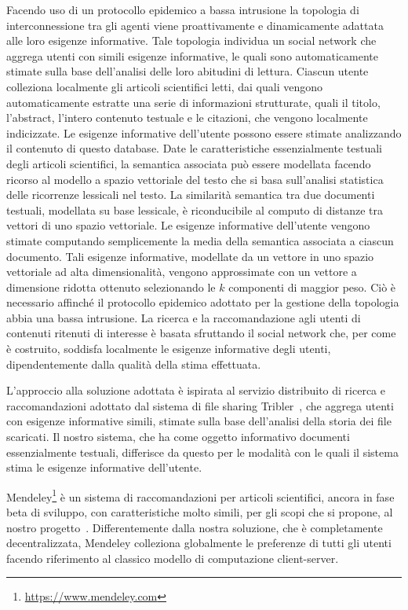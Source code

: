 Facendo uso di un protocollo epidemico a bassa intrusione la topologia di interconnessione tra gli agenti viene proattivamente e dinamicamente adattata alle loro esigenze informative. Tale topologia individua un social network che  aggrega utenti con simili esigenze informative, le quali sono automaticamente stimate sulla base dell'analisi delle loro abitudini di lettura. Ciascun utente colleziona localmente gli articoli scientifici letti, dai quali vengono automaticamente estratte una serie di informazioni strutturate, quali il titolo, l'abstract, l'intero contenuto testuale e le citazioni, che vengono localmente indicizzate. Le esigenze informative dell'utente possono essere stimate analizzando il contenuto di questo database. Date le caratteristiche essenzialmente testuali degli articoli scientifici, la semantica associata può essere modellata facendo ricorso al modello a spazio vettoriale del testo che si basa sull'analisi statistica delle ricorrenze lessicali nel testo. La similarità semantica tra due documenti testuali, modellata su base lessicale, è riconducibile al computo di distanze tra vettori di uno spazio vettoriale. Le esigenze informative dell'utente vengono stimate computando semplicemente la media della semantica associata a ciascun documento. Tali esigenze informative, modellate da un vettore in uno spazio vettoriale ad alta dimensionalità, vengono approssimate con un vettore a dimensione ridotta ottenuto selezionando le $k$ componenti di maggior peso. Ciò è necessario affinché il protocollo epidemico adottato per la gestione della topologia abbia una bassa intrusione. La ricerca e la raccomandazione agli utenti di contenuti ritenuti di interesse è basata sfruttando il social network che, per come è costruito, soddisfa localmente le esigenze informative degli utenti, dipendentemente dalla qualità della stima effettuata.

L'approccio alla soluzione adottata è ispirata al servizio distribuito di ricerca e raccomandazioni adottato dal sistema di file sharing Tribler~\cite{PGW+08}, che aggrega utenti con esigenze informative simili, stimate sulla base dell'analisi della storia dei file scaricati. Il nostro sistema, che ha come oggetto informativo documenti essenzialmente testuali, differisce da questo per le modalità con le quali il sistema stima le esigenze informative dell'utente.

Mendeley\footnote{\url{https://www.mendeley.com}} è un sistema di raccomandazioni per articoli scientifici, ancora in fase beta di sviluppo, con caratteristiche molto simili, per gli scopi che si propone, al nostro progetto~\cite{HR08}. Differentemente dalla nostra soluzione, che è completamente decentralizzata, Mendeley colleziona globalmente le preferenze di tutti gli utenti facendo riferimento al classico modello di computazione client-server.

